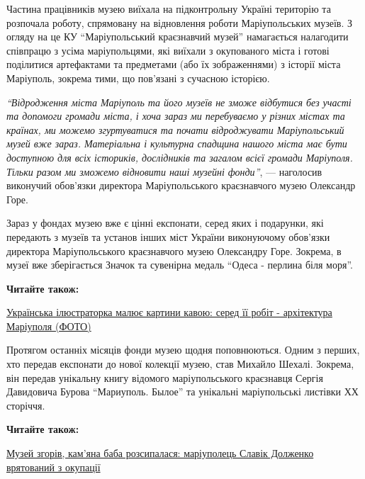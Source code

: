 Частина працівників музею виїхала на підконтрольну Україні територію та
розпочала роботу, спрямовану на відновлення роботи Маріупольських музеїв. З
огляду на це КУ \enquote{Маріупольський краєзнавчий музей} намагається налагодити
співпрацю з усіма маріупольцями, які виїхали з окупованого міста і готові
поділитися артефактами та предметами (або їх зображеннями) з історії міста
Маріуполь, зокрема тими, що пов'язані з сучасною історією. 

\begin{leftbar}
	\begingroup
{\em\enquote{Відродження міста Маріуполь та його музеїв не зможе відбутися без участі
та допомоги громади міста, і хоча зараз ми перебуваємо у різних містах
та країнах, ми можемо згуртуватися та почати відроджувати
Маріупольський музей вже зараз. Матеріальна і культурна спадщина нашого
міста має бути доступною для всіх істориків, дослідників та загалом
всієї громади Маріуполя. Тільки разом ми зможемо відновити наші музейні
фонди}}, — наголосив виконучий обов'язки директора Маріупольського
краєзнавчого музею Олександр Горе.
	\endgroup
\end{leftbar}

Зараз у фондах музею вже є цінні експонати, серед яких і подарунки, які
передають з музеїв та установ інших міст України виконуючому обов'язки
директора Маріупольського краєзнавчого музею Олександру Горе. Зокрема, в музеї
вже зберігається Значок та сувенірна медаль \enquote{Одеса - перлина біля моря}. 

\textbf{Читайте також:} 

\href{https://donbas24.news/news/ukrayinska-ilyustratorka-malyuje-kartini-kavoyu-sered-yiyi-robit-arxitektura-mariupolya-foto}{%
Українська ілюстраторка малює картини кавою: серед її робіт - архітектура Маріуполя (ФОТО)}


Протягом останніх місяців фонди музею щодня поповнюються. Одним з перших, хто
передав експонати до нової колекції музею, став Михайло Шехалі. Зокрема, він
передав унікальну книгу відомого маріупольського краєзнавця Сергія Давидовича
Бурова \enquote{Мариуполь. Былое} та унікальні маріупольські листівки ХХ сторіччя.


\textbf{Читайте також:} 

\href{https://donbas24.news/news/muzei-zgoriv-kamyana-baba-rozsipalasya-mariupolec-slavik-dolzenko-vryatuvavsya-z-okupaciyi}{%
Музей згорів, кам'яна баба розсипалася: маріуполець Славік Долженко врятований з окупації}

